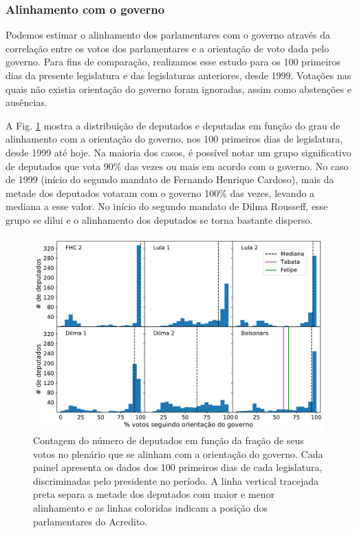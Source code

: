 \documentclass[12pt,a4paper]{article}
\begin{document}
\subsubsection{Alinhamento com o governo}
\label{sec:apoio-governo}

Podemos estimar o alinhamento dos parlamentares com o governo através da correlação entre os votos dos parlamentares e a orientação de voto
dada pelo governo. Para fins de comparação, realizamos esse estudo para os 100 primeiros dias da presente legislatura
e das legislaturas anteriores, desde 1999. Votações nas quais não existia orientação do governo foram ignoradas, assim como abstenções e ausências.

A Fig. \ref{fig:apoio-governo-deputados} mostra a distribuição de deputados e deputadas em função do grau de
alinhamento com a orientação do governo, nos 100 primeiros dias de legislatura, desde 1999 até hoje.
Na maioria dos casos, é possível notar um grupo significativo de deputados que vota 90\% das vezes ou mais em acordo com o governo.
No caso de 1999 (início do segundo mandato de Fernando Henrique Cardoso), mais da metade dos deputados votaram
com o governo 100\% das vezes, levando a mediana a esse valor. No início do segundo mandato de Dilma Rousseff,
esse grupo se dilui e o alinhamento dos deputados se torna bastante disperso.

\begin{figure}[H]
\centering
\includegraphics[width=1.0\textwidth]{graficos/apoio_ao_governo_deputados_2019-04-30.pdf}
\caption{Contagem do número de deputados em função da fração de seus votos no plenário que se
  alinham com a orientação do governo. Cada painel apresenta os dados dos 100 primeiros dias de
  cada legislatura, discriminadas pelo presidente no período. A linha vertical tracejada preta
  separa a metade dos deputados com maior e menor alinhamento e as linhas coloridas indicam a posição
  dos parlamentares do Acredito.}
\label{fig:apoio-governo-deputados}
\end{figure}
\end{document}
